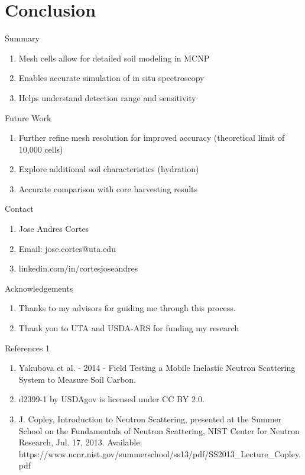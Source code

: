 \documentclass[10pt,hyperref={colorlinks,citecolor=blue,urlcolor=peking_blue,linkcolor=}]{beamer}
\theoremstyle{plain}
\begin{document}
\section{Conclusion}
\begin{frame}{Summary}
\begin{enumerate}
\item Mesh cells allow for detailed soil modeling in MCNP
\item Enables accurate simulation of in situ spectroscopy
\item Helps understand detection range and sensitivity
\end{enumerate}
\end{frame}
\begin{frame}{Future Work}
\begin{enumerate}
\item Further refine mesh resolution for improved accuracy (theoretical limit of 10,000 cells)
\item Explore additional soil characteristics (hydration)
\item Accurate comparison with core harvesting results
\end{enumerate}
\end{frame}
\begin{frame}{Contact}
\begin{enumerate}
\item Jose Andres Cortes
\item Email: jose.cortes@uta.edu
\item linkedin.com/in/cortesjoseandres
\end{enumerate}
\end{frame}
\begin{frame}{Acknowledgements}
\begin{enumerate}
\item Thanks to my advisors for guiding me through this process.
\item Thank you to UTA and USDA-ARS for funding my research
\end{enumerate}
\end{frame}
\begin{frame}{References 1}
\begin{enumerate}
\item Yakubova et al. - 2014 - Field Testing a Mobile Inelastic Neutron Scattering System to Measure Soil Carbon.
\item d2399-1 by USDAgov is licensed under CC BY 2.0.
\item J. Copley, Introduction to Neutron Scattering, presented at the Summer School on the Fundamentals of Neutron Scattering, NIST Center for Neutron Research, Jul. 17, 2013. Available: https://www.ncnr.nist.gov/summerschool/ss13/pdf/SS2013_Lecture_Copley.pdf
\end{enumerate}
\end{frame}
\end{document}
